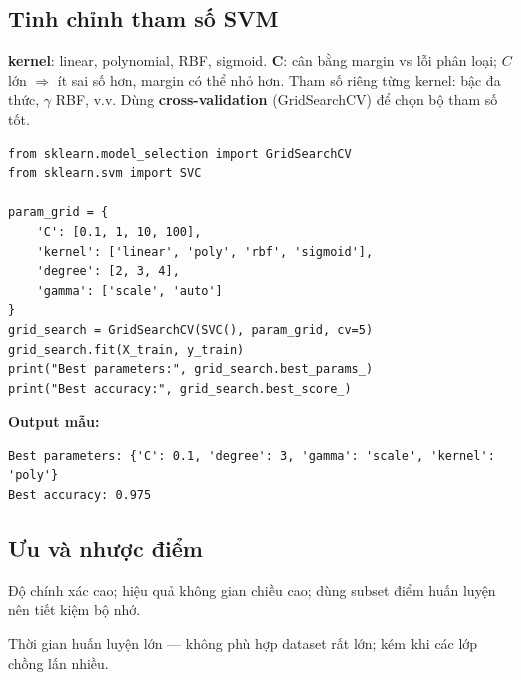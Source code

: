 \subsection{Tinh chỉnh tham số SVM}

\begin{phuongphap}[title={Tham số quan trọng}]
\textbf{kernel}: linear, polynomial, RBF, sigmoid.
\textbf{C}: cân bằng margin vs lỗi phân loại; $C$ lớn $\Rightarrow$ ít sai số hơn, margin có thể nhỏ hơn.
Tham số riêng từng kernel: bậc đa thức, $\gamma$ RBF, v.v.
Dùng \textbf{cross-validation} (GridSearchCV) để chọn bộ tham số tốt.
\end{phuongphap}

\begin{vidu}[title={GridSearchCV}]
\begin{lstlisting}
from sklearn.model_selection import GridSearchCV
from sklearn.svm import SVC

param_grid = {
    'C': [0.1, 1, 10, 100],
    'kernel': ['linear', 'poly', 'rbf', 'sigmoid'],
    'degree': [2, 3, 4],
    'gamma': ['scale', 'auto']
}
grid_search = GridSearchCV(SVC(), param_grid, cv=5)
grid_search.fit(X_train, y_train)
print("Best parameters:", grid_search.best_params_)
print("Best accuracy:", grid_search.best_score_)
\end{lstlisting}

\textbf{Output mẫu:}
\begin{verbatim}
Best parameters: {'C': 0.1, 'degree': 3, 'gamma': 'scale', 'kernel': 'poly'}
Best accuracy: 0.975
\end{verbatim}
\end{vidu}

\subsection{Ưu và nhược điểm}

\begin{tinhchat}[title={Ưu điểm}]
Độ chính xác cao; hiệu quả không gian chiều cao; dùng subset điểm huấn luyện nên tiết kiệm bộ nhớ.
\end{tinhchat}

\begin{luuy}[title={Nhược điểm}]
Thời gian huấn luyện lớn --- không phù hợp dataset rất lớn; kém khi các lớp chồng lấn nhiều.
\end{luuy}
